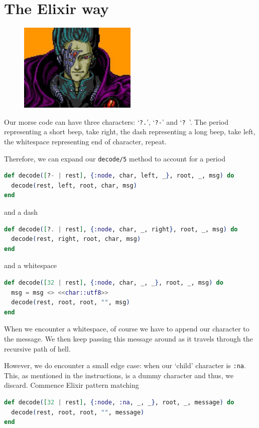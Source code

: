 \section{The Elixir way}
\begin{figure}[h]
    \centering
    \includegraphics[width=0.5\textwidth]{img/base}
\end{figure}
Our morse code can have three characters: `\texttt{?.}', `\texttt{?-}' and `\texttt{? }'. The period representing a short beep, take right, the dash representing a long beep, take left, the whitespace representing end of character, repeat.

Therefore, we can expand our \texttt{decode/5} method to account for a period
\begin{lstlisting}[language=Elixir]
def decode([?- | rest], {:node, char, left, _}, root, _, msg) do
  decode(rest, left, root, char, msg)
end
\end{lstlisting}
and a dash
\begin{lstlisting}[language=Elixir]
def decode([?. | rest], {:node, char, _, right}, root, _, msg) do
  decode(rest, right, root, char, msg)
end
\end{lstlisting}
and a whitespace
\begin{lstlisting}[language=Elixir]
def decode([32 | rest], {:node, char, _, _}, root, _, msg) do
  msg = msg <> <<char::utf8>>
  decode(rest, root, root, "", msg)
end
\end{lstlisting}

When we encounter a whitespace, of course we have to append our character to the message. We then keep passing this message around as it travels through the recursive path of hell.

However, we do encounter a small edge case: when our `child' character is \texttt{:na}. This, as mentioned in the instructions, is a dummy character and thus, we discard. Commence Elixir pattern matching
\begin{lstlisting}[language=Elixir]
def decode([32 | rest], {:node, :na, _, _}, root, _, message) do
  decode(rest, root, root, "", message)
end    
\end{lstlisting}

